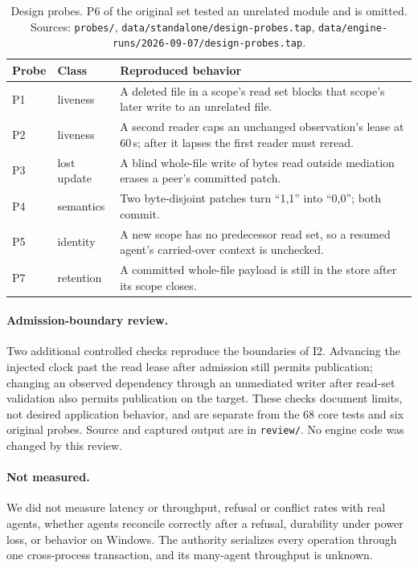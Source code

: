 \documentclass[10pt]{article}
\newcommand{\code}[1]{\texttt{#1}}
\begin{document}
\begin{table}[t]
\centering\small
\begin{tabular}{@{}llp{9.2cm}@{}}
\toprule
Probe & Class & Reproduced behavior \\
\midrule
P1 & liveness & A deleted file in a scope's read set blocks that scope's later write to an unrelated file. \\
P2 & liveness & A second reader caps an unchanged observation's lease at 60\,s; after it lapses the first reader must reread. \\
P3 & lost update & A blind whole-file write of bytes read outside mediation erases a peer's committed patch. \\
P4 & semantics & Two byte-disjoint patches turn ``1,1'' into ``0,0''; both commit. \\
P5 & identity & A new scope has no predecessor read set, so a resumed agent's carried-over context is unchecked. \\
P7 & retention & A committed whole-file payload is still in the store after its scope closes. \\
\bottomrule
\end{tabular}
\caption{Design probes. P6 of the original set tested an unrelated module and is omitted. Sources: \code{probes/}, \code{data/standalone/design-probes.tap}, \code{data/engine-runs/2026-09-07/design-probes.tap}.}
\label{tab:probes}
\end{table}

\paragraph{Admission-boundary review.}
Two additional controlled checks reproduce the boundaries of I2. Advancing the injected clock past the read lease after admission still permits publication; changing an observed dependency through an unmediated writer after read-set validation also permits publication on the target. These checks document limits, not desired application behavior, and are separate from the 68 core tests and six original probes. Source and captured output are in \code{review/}. No engine code was changed by this review.

\paragraph{Not measured.}
We did not measure latency or throughput, refusal or conflict rates with real agents, whether agents reconcile correctly after a refusal, durability under power loss, or behavior on Windows. The authority serializes every operation through one cross-process transaction, and its many-agent throughput is unknown.
\end{document}
